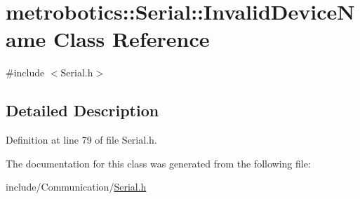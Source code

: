 \hypertarget{classmetrobotics_1_1Serial_1_1InvalidDeviceName}{\section{metrobotics\-:\-:\-Serial\-:\-:\-Invalid\-Device\-Name \-Class \-Reference}
\label{classmetrobotics_1_1Serial_1_1InvalidDeviceName}
}


{\ttfamily \#include $<$\-Serial.\-h$>$}



\subsection{\-Detailed \-Description}


\-Definition at line 79 of file \-Serial.\-h.



\-The documentation for this class was generated from the following file\-:\begin{DoxyCompactItemize}
\item 
include/\-Communication/\hyperlink{Serial_8h}{\-Serial.\-h}\end{DoxyCompactItemize}
